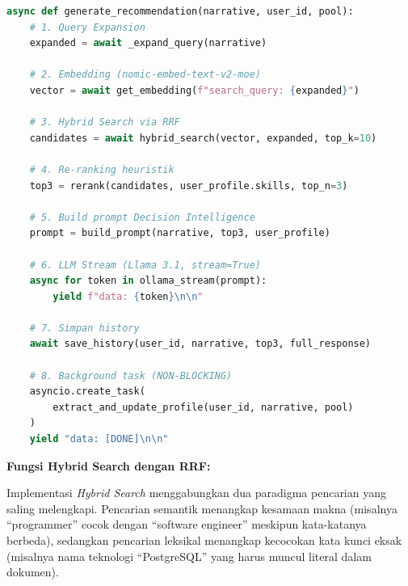 \begin{lstlisting}[language=Python, caption={Alur pipeline RAG di \texttt{llm\_service.py}}]
async def generate_recommendation(narrative, user_id, pool):
    # 1. Query Expansion
    expanded = await _expand_query(narrative)

    # 2. Embedding (nomic-embed-text-v2-moe)
    vector = await get_embedding(f"search_query: {expanded}")

    # 3. Hybrid Search via RRF
    candidates = await hybrid_search(vector, expanded, top_k=10)

    # 4. Re-ranking heuristik
    top3 = rerank(candidates, user_profile.skills, top_n=3)

    # 5. Build prompt Decision Intelligence
    prompt = build_prompt(narrative, top3, user_profile)

    # 6. LLM Stream (Llama 3.1, stream=True)
    async for token in ollama_stream(prompt):
        yield f"data: {token}\n\n"

    # 7. Simpan history
    await save_history(user_id, narrative, top3, full_response)

    # 8. Background task (NON-BLOCKING)
    asyncio.create_task(
        extract_and_update_profile(user_id, narrative, pool)
    )
    yield "data: [DONE]\n\n"
\end{lstlisting}

\textbf{Fungsi Hybrid Search dengan RRF:}

Implementasi \textit{Hybrid Search} menggabungkan dua paradigma pencarian yang saling
melengkapi. Pencarian semantik menangkap kesamaan makna (misalnya ``programmer'' cocok
dengan ``software engineer'' meskipun kata-katanya berbeda), sedangkan pencarian leksikal
menangkap kecocokan kata kunci eksak (misalnya nama teknologi ``PostgreSQL'' yang harus
muncul literal dalam dokumen).


